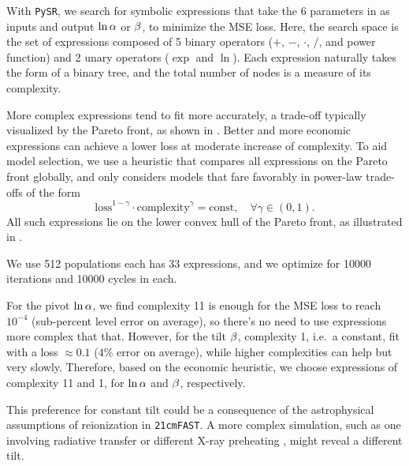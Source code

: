 With \texttt{PySR}, we search for symbolic expressions that take the 6
parameters in  as inputs and output $\ln\alpha$ or $\beta$,
to minimize the MSE loss.
Here, the search space is the set of expressions composed of 5 binary
operators ($+$, $-$, $\cdot$, $/$, and power function) and 2 unary
operators ($\exp$ and $\ln$).
Each expression naturally takes the form of a binary tree, and the
total number of nodes is a measure of its complexity.

More complex expressions tend to fit more accurately, a trade-off
typically visualized by the Pareto front, as shown in .
Better and more economic expressions can achieve a lower loss at
moderate increase of complexity.
To aid model selection, we use a heuristic that compares all expressions
on the Pareto front globally, and only considers models that fare
favorably in power-law trade-offs of the form
%
\begin{equation}
\mathrm{loss}^{1 - \gamma} \cdot \mathrm{complexity}^\gamma
= \mathrm{const}, \quad \forall \gamma \in (0, 1).
\end{equation}
All such expressions lie on the lower convex hull of the Pareto front,
as illustrated in .

We use 512 populations each has 33 expressions, and we optimize for
10000 iterations and 10000 cycles in each.

For the pivot $\ln\alpha$, we find complexity 11 is enough for the MSE loss
to reach $10^{-4}$ (sub-percent level error on average), so there's no
need to use expressions more complex that that.
However, for the tilt $\beta$, complexity 1, i.e.\ a constant, fit with
a loss $\approx 0.1$ ($4\%$ error on average), while higher complexities
can help but very slowly.
Therefore, based on the economic heuristic, we choose expressions of
complexity 11 and 1, for $\ln\alpha$ and $\beta$, respectively.

This preference for constant tilt could be a consequence of the
astrophysical assumptions of reionization in \texttt{21cmFAST}.
A more complex simulation, such as one involving radiative transfer or
different X-ray preheating \cite{Montero2024}, might reveal a different
tilt.

